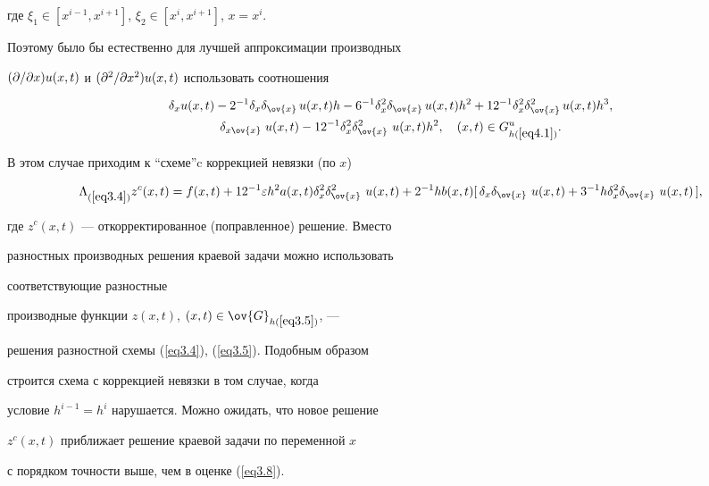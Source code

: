 где $\xi_1\in [x^{i-1},x^{i+1}]$, $\xi_2\in[x^i,x^{i+1}]$, $x=x^i$.


Поэтому было бы естественно для лучшей аппроксимации производных


$(\partial/\partial x)u(x,t)$ и $(\partial^2/\partial x^2)u(x,t)$ использовать соотношения


\begin{gather*}


\delta_xu(x,t)-2^{-1}\delta_x\delta_{\ov{x}}\,u(x,t)h-


6^{-1}\delta_x^2\delta_{\ov{x}}\,u(x,t)h^2+


12^{-1}\delta_x^2\delta^2_{\ov{x}}\,u(x,t)h^3, \\


\delta_{x\ov{x}_{\,\,}}u(x,t)-12^{-1}


\delta_{x}^2\delta^2_{\ov{x}_{\,}}\,u(x,t)h^2,


\quad (x,t)\in G^u_{h(\ref{eq4.1})}.


\end{gather*}


В этом случае приходим к ``схеме''c коррекцией невязки (по $x$)


$$


\Lambda_{(\ref{eq3.4})}z^c(x,t)=f(x,t)+


12^{-1}\eps h^2 a(x,t)\delta^2_x\delta^2_{\ov{x}_{\,}}\,u(x,t)+


2^{-1}h b(x,t)[\,\delta_x\delta_{\ov{x}_{\,}}\,u(x,t)+


3^{-1}h\delta_x^2\delta_{\ov{x}_{\,}}\,u(x,t)\,],


$$


где $z^c(x,t)$ --- откорректированное (поправленное) решение. Вместо


разностных производных решения краевой задачи можно использовать


соответствующие разностные


производные функции $z(x,t)$, $(x,t)\in\ov{G}_{h(\ref{eq3.5})}$, ---


решения разностной схемы (\ref{eq3.4}), (\ref{eq3.5}). Подобным образом


строится схема с коррекцией невязки в том случае, когда


условие $h^{i-1}=h^i$ нарушается. Можно ожидать, что новое решение


$z^c(x,t)$ приближает решение краевой задачи по переменной $x$


с порядком точности выше, чем в оценке (\ref{eq3.8}).





